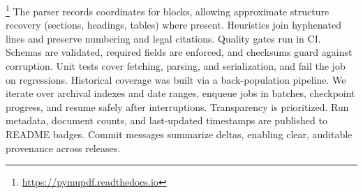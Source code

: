 \documentclass[10pt,a4paper]{article}%
\begin{document}
\footnote{\href{https://pymupdf.readthedocs.io}{https://pymupdf.readthedocs.io}}%
\newline%
\newline%
The parser records coordinates for blocks, allowing approximate structure recovery (sections, headings, tables) where present. Heuristics join hyphenated lines and preserve numbering and legal citations.%
\citep{DocumentLayoutAnalysis2021}%
\newline%
\newline%
Quality gates run in CI. Schemas are validated, required fields are enforced, and checksums guard against corruption. Unit tests cover fetching, parsing, and serialization, and fail the job on regressions.%
\citep{DataQuality2022}%
\newline%
\newline%
Historical coverage was built via a back-population pipeline. We iterate over archival indexes and date ranges, enqueue jobs in batches, checkpoint progress, and resume safely after interruptions.%
\citep{HistoricalWebData2019}%
\newline%
\newline%
Transparency is prioritized. Run metadata, document counts, and last-updated timestamps are published to README badges. Commit messages summarize deltas, enabling clear, auditable provenance across releases.%
\citep{OpenDataPractices2020}%
\newline%
\newline

%
\end{document}
